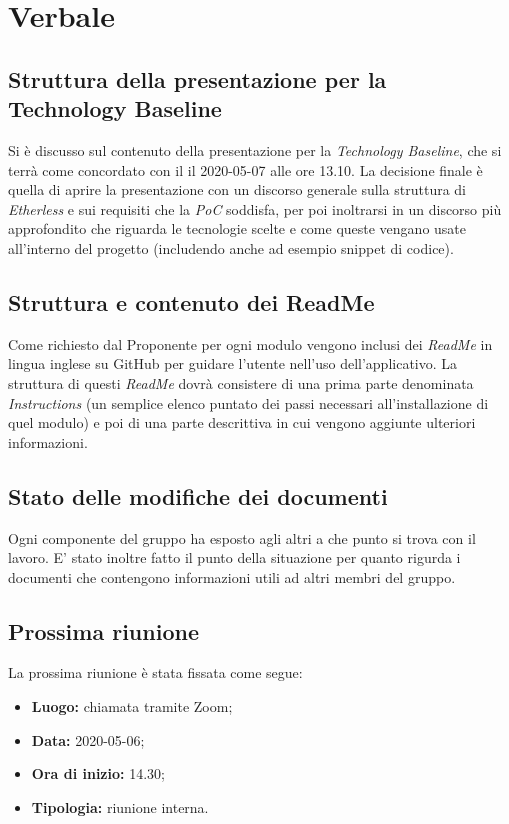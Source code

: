 \section{Verbale}
	
	\subsection{Struttura della presentazione per la Technology Baseline}
	Si è discusso sul contenuto della presentazione per la \textit{Technology Baseline}, che si terrà come concordato con il \RC{} il 2020-05-07 alle ore 13.10. La decisione finale è quella di aprire la presentazione con un discorso generale sulla struttura di \textit{Etherless} e sui requisiti che la \textit{PoC} soddisfa, per poi inoltrarsi in un discorso più approfondito che riguarda le tecnologie scelte e come queste vengano usate all'interno del progetto (includendo anche ad esempio snippet di codice).
	
	\subsection{Struttura e contenuto dei ReadMe}
	Come richiesto dal Proponente per ogni modulo vengono inclusi dei \textit{ReadMe} in lingua inglese su GitHub per guidare l'utente nell'uso dell'applicativo. La struttura di questi \textit{ReadMe} dovrà consistere di una prima parte denominata \textit{Instructions} (un semplice elenco puntato dei passi necessari all'installazione di quel modulo) e poi di una parte descrittiva in cui vengono aggiunte ulteriori informazioni.
	
		\subsection{Stato delle modifiche dei documenti}
	Ogni componente del gruppo ha esposto agli altri a che punto si trova con il lavoro. E' stato inoltre fatto il punto della situazione per quanto rigurda i documenti che contengono informazioni utili ad altri membri del gruppo.
			
	\subsection{Prossima riunione}
		La prossima riunione è stata fissata come segue:
		\begin{itemize}
			\item{\textbf{Luogo: } chiamata tramite Zoom; }
			\item{\textbf{Data: } 2020-05-06;}
			\item{\textbf{Ora di inizio: } 14.30;}
			\item{\textbf{Tipologia: } riunione interna.}
		\end{itemize}

